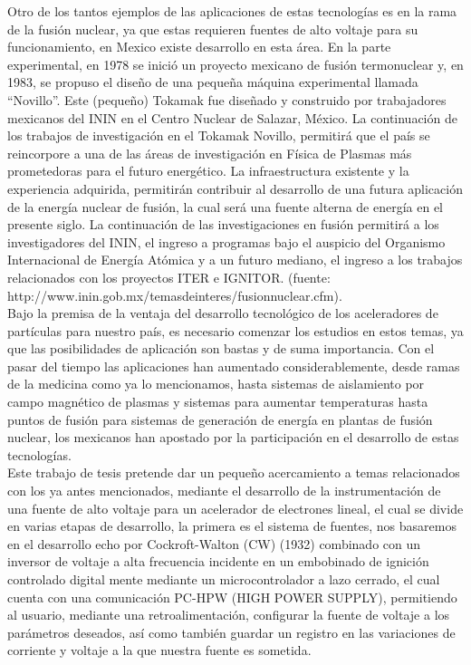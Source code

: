 Otro de los tantos ejemplos de las aplicaciones de estas tecnologías es en la rama de la fusión nuclear, ya que estas requieren fuentes de alto voltaje para su funcionamiento, en Mexico existe desarrollo en esta área. En la parte experimental, en 1978 se inició un proyecto mexicano de fusión termonuclear y, en 1983, se propuso el diseño de una pequeña máquina experimental llamada “Novillo”. Este (pequeño) Tokamak fue diseñado y construido por trabajadores mexicanos del ININ en el Centro Nuclear de Salazar, México. La continuación de los trabajos de investigación en el Tokamak Novillo, permitirá que el país se reincorpore a una de las áreas de investigación en Física de Plasmas más prometedoras para el futuro energético. La infraestructura existente y la experiencia adquirida, permitirán contribuir al desarrollo de una futura aplicación de la energía nuclear de fusión, la cual será una fuente alterna de energía en el presente siglo. La continuación de las investigaciones en fusión permitirá a los investigadores del ININ, el ingreso a programas bajo el auspicio del Organismo Internacional de Energía Atómica y a un futuro mediano, el ingreso a los trabajos relacionados con los proyectos ITER e IGNITOR. (fuente: http://www.inin.gob.mx/temasdeinteres/fusionnuclear.cfm).\\

Bajo la premisa de la ventaja del desarrollo tecnológico de los aceleradores de partículas para nuestro país, es necesario comenzar los estudios en estos temas, ya que las posibilidades de aplicación son bastas y de suma importancia. Con el pasar del tiempo las aplicaciones han aumentado considerablemente, desde ramas de la medicina como ya lo mencionamos, hasta sistemas de aislamiento por campo magnético de plasmas y sistemas para aumentar temperaturas hasta puntos de fusión para sistemas de generación de energía en plantas de fusión nuclear, los mexicanos han apostado por la participación en el desarrollo de estas tecnologías.\\

Este trabajo de tesis pretende dar un pequeño acercamiento a temas relacionados con los ya antes mencionados, mediante el desarrollo de la instrumentación de una fuente de alto voltaje para un acelerador de electrones lineal, el cual se divide en varias etapas de desarrollo, la primera es el sistema de fuentes, nos basaremos en el desarrollo echo por Cockroft-Walton (CW) (1932) combinado con un inversor de voltaje a alta frecuencia incidente en un embobinado de ignición controlado digital mente mediante un microcontrolador a lazo cerrado, el cual cuenta con una comunicación PC-HPW (HIGH POWER SUPPLY), permitiendo al usuario, mediante una retroalimentación, configurar la fuente de voltaje a los parámetros deseados, así como también guardar un registro en las variaciones de corriente y voltaje a la que nuestra fuente es sometida. \\
\newpage


